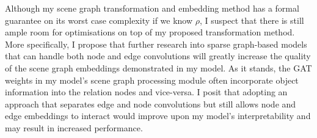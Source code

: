 Although my scene graph transformation and embedding method has a formal guarantee on its worst case complexity if we know \(\rho\), I suspect that there is still ample room for optimisations on top of my proposed transformation method. More specifically, I propose that further research into sparse graph-based models that can handle both node and edge convolutions will greatly increase the quality of the scene graph embeddings demonstrated in my model. As it stands, the GAT weights in my model's scene graph processing module often incorporate object information into the relation nodes and vice-versa. I posit that adopting an approach that separates edge and node convolutions but still allows node and edge embeddings to interact would improve upon my model's interpretability and may result in increased performance.
